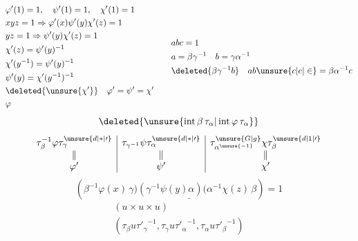 \[
\begin{aligned}
 &\varphi'(1)=1,\quad \psi'(1)=1,\quad \chi'(1)=1\\
 &xyz=1\Rightarrow \varphi'(x)\psi'(y)\chi'(z)=1\\
 &yz=1\Rightarrow \psi'(y)\chi'(z)=1\\
 &\chi'(z)=\psi'(y)^{-1}\\
 &\chi'(y^{-1})=\psi'(y)^{-1}\\
 &\psi'(y)=\chi'(y^{-1})^{-1}\\
 &\deleted{\unsure{\chi'}}\quad \varphi'=\psi'=\chi'\\
 &\varphi
\end{aligned}
\qquad
\begin{aligned}
 &abc=1\\
 &a=\beta\gamma^{-1}\quad b=\gamma\alpha^{-1}\\
 &\deleted{\beta\gamma^{-1}b}\quad ab\unsure{c|e|\in}=\beta\alpha^{-1}c
\end{aligned}
\]
\[
 \deleted{\unsure{\operatorname{int}\beta\,\tau_\alpha|\operatorname{int}\varphi\,\tau_{\alpha}}}
\]
\[
 \begin{array}{c|c|c}
 \tau_{\beta}^{-1}\varphi\tau_{\gamma}^{\unsure{d|*|\prime}}&
 \tau_{\gamma^{-1}}\psi\tau_{\alpha}^{\unsure{d|*|\prime}}&
 \tau_{\alpha^{\unsure{-1}}}^{\unsure{G|g}}\chi\tau_{\beta}^{\unsure{d|1|\prime}}\\
 \Vert&\Vert&\Vert\\ \varphi'&\psi'&\chi'
 \end{array}
\]
\[
 (\beta^{-1}\varphi(x)\,\underline{\gamma)(\gamma^{-1}\psi(y)\alpha)(\alpha^{-1}\chi(z)}\,\beta)=1
\]
\[
 \begin{gathered}
 (u\times u\times u)\\
 (\tau_\beta u{\tau'_\gamma}^{-1},\tau_\gamma u{\tau'_\alpha}^{-1},\tau_\alpha u{\tau'_\beta}^{-1})
 \end{gathered}
\]
